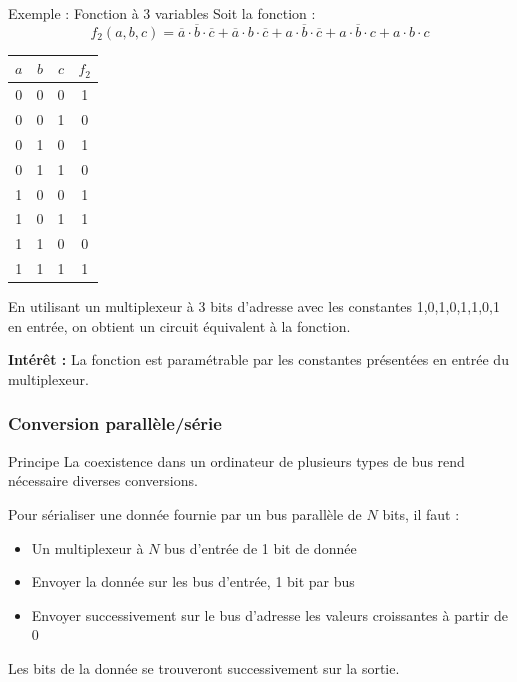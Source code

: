 \documentclass[a4paper,12pt]{article}
\begin{document}
\begin{examplebox}{Exemple : Fonction à 3 variables}
Soit la fonction :
\[f_2(a,b,c) = \overline{a} \cdot \overline{b} \cdot \overline{c} + \overline{a} \cdot b \cdot \overline{c} + a \cdot \overline{b} \cdot \overline{c} + a \cdot \overline{b} \cdot c + a \cdot b \cdot c\]

\begin{center}
\begin{tabular}{|c|c|c|c|}
\hline
$a$ & $b$ & $c$ & $f_2$ \\
\hline
0 & 0 & 0 & 1 \\
0 & 0 & 1 & 0 \\
0 & 1 & 0 & 1 \\
0 & 1 & 1 & 0 \\
1 & 0 & 0 & 1 \\
1 & 0 & 1 & 1 \\
1 & 1 & 0 & 0 \\
1 & 1 & 1 & 1 \\
\hline
\end{tabular}
\end{center}

En utilisant un multiplexeur à 3 bits d'adresse avec les constantes 1,0,1,0,1,1,0,1 en entrée, on obtient un circuit équivalent à la fonction.

\textbf{Intérêt :} La fonction est paramétrable par les constantes présentées en entrée du multiplexeur.
\end{examplebox}

\subsubsection{Conversion parallèle/série}

\begin{propbox}{Principe}
La coexistence dans un ordinateur de plusieurs types de bus rend nécessaire diverses conversions. 

Pour sérialiser une donnée fournie par un bus parallèle de $N$ bits, il faut :
\begin{itemize}
    \item Un multiplexeur à $N$ bus d'entrée de 1 bit de donnée
    \item Envoyer la donnée sur les bus d'entrée, 1 bit par bus
    \item Envoyer successivement sur le bus d'adresse les valeurs croissantes à partir de 0
\end{itemize}

Les bits de la donnée se trouveront successivement sur la sortie.
\end{propbox}
\end{document}

